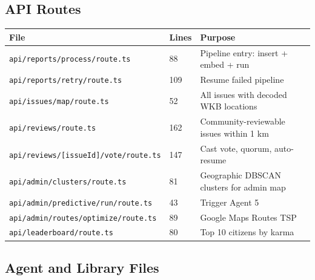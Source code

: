 \documentclass[11pt,a4paper]{article}
\newcommand{\thead}[1]{{\color{white}\bfseries\sffamily #1}}
\newcommand{\file}[1]{\texttt{\footnotesize\color{cpgray}#1}}
\begin{document}
\subsection{API Routes}

\begin{tabular}{@{} L{7cm} C{1cm} L{6cm} @{}}
\toprule
{}
\thead{File} & \thead{Lines} & \thead{Purpose} \\
\midrule
\file{api/reports/process/route.ts}          & 88  & Pipeline entry: insert + embed + run \\
\file{api/reports/retry/route.ts}            & 109 & Resume failed pipeline \\
\file{api/issues/map/route.ts}               & 52  & All issues with decoded WKB locations \\
\file{api/reviews/route.ts}                  & 162 & Community-reviewable issues within 1 km \\
\file{api/reviews/[issueId]/vote/route.ts}   & 147 & Cast vote, quorum, auto-resume \\
\file{api/admin/clusters/route.ts}           & 81  & Geographic DBSCAN clusters for admin map \\
\file{api/admin/predictive/run/route.ts}     & 43  & Trigger Agent 5 \\
\file{api/admin/routes/optimize/route.ts}    & 89  & Google Maps Routes TSP \\
\file{api/leaderboard/route.ts}              & 80  & Top 10 citizens by karma \\
\bottomrule
\end{tabular}

\subsection{Agent and Library Files}
\end{document}

